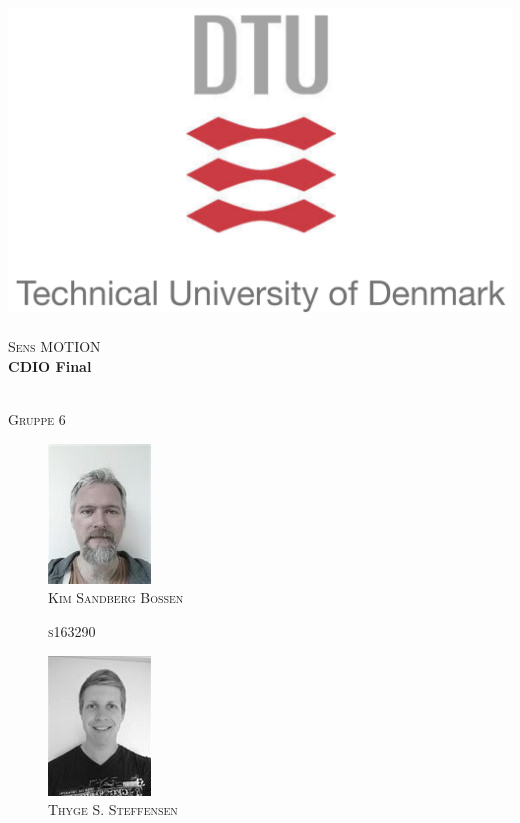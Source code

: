 \begin{titlepage}
\begin{center}

\includegraphics{Pictures/frontpage/dtu-logo.png}~\\[0.5cm]
\textsc{\Large Sens MOTION } \\%

\HRule 
{ \huge \bfseries CDIO Final \\[0.1cm] } %

\HRule \\[0.8cm]
\textsc{Gruppe 6}
\begin{multicols}{5}
\begin{figure}[H]
        \centering
        \includegraphics[scale=0.8]{Pictures/frontpage/kim.png}\\
        \textsc{Kim Sandberg Bossen}
        
        \textsc{s163290}\\
        \hfill \break
        \hfill \break
    \end{figure}
\columnbreak
    \begin{figure}[H]
        \centering
        \includegraphics[scale=0.6]{Pictures/frontpage/Thyge.png}\\
        \textsc{Thyge S. Steffensen}
        

\end{figure}
\end{multicols}
\end{center}
\end{titlepage}
